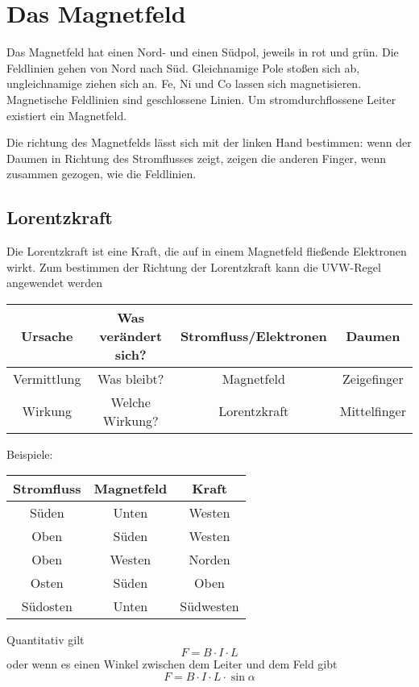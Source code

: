 \documentclass{article}
\begin{document}
\section{Das Magnetfeld}
Das Magnetfeld hat einen Nord- und einen Südpol, jeweils in rot und grün. Die Feldlinien gehen von Nord nach Süd.
Gleichnamige Pole stoßen sich ab, ungleichnamige ziehen sich an.
Fe, Ni und Co lassen sich magnetisieren.
Magnetische Feldlinien sind geschlossene Linien.
Um stromdurchflossene Leiter existiert ein Magnetfeld. 
 
Die richtung des Magnetfelds lässt sich mit der linken Hand bestimmen: wenn der Daumen in Richtung des Stromflusses zeigt, zeigen die anderen Finger, wenn zusammen gezogen, wie die Feldlinien. 
 
\subsection{Lorentzkraft}
Die Lorentzkraft ist eine Kraft, die auf in einem Magnetfeld fließende Elektronen wirkt. Zum bestimmen der Richtung der Lorentzkraft kann die UVW-Regel angewendet werden
\begin{center}
\begin{tabular}{ |c|c|c|c| }
\hline
 Ursache & Was verändert sich? & Stromfluss/Elektronen & Daumen \\
\hline
 Vermittlung & Was bleibt? & Magnetfeld & Zeigefinger \\
\hline
 Wirkung & Welche Wirkung? & Lorentzkraft & Mittelfinger \\
\hline
\end{tabular}
\end{center}
Beispiele:
\begin{center}
\begin{tabular}{ |c|c|c| }
\hline
 Stromfluss & Magnetfeld & Kraft \\
\hline
 Süden & Unten & Westen \\
 Oben & Süden & Westen \\
 Oben & Westen & Norden \\
 Osten & Süden & Oben \\
 Südosten & Unten & Südwesten \\
\hline
\end{tabular}
\end{center}
 
Quantitativ gilt
\[F=B \cdot I \cdot L\]
oder wenn es einen Winkel zwischen dem Leiter und dem Feld gibt
\[F=B \cdot I \cdot L \cdot \sin{\alpha}\]
 
\end{document}
